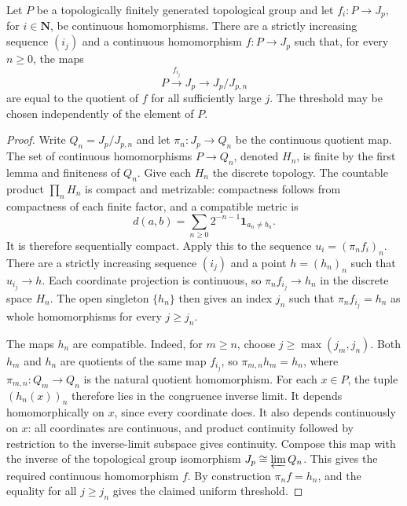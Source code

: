 \begin{lemma}
\label{lem:nottingham-hom-diagonal-limit}
\leanok
Let $P$ be a topologically finitely generated topological group and
let $f_i:P\to J_p$, for $i\in\mathbf N$, be continuous homomorphisms.
There are a strictly increasing sequence $(i_j)$ and a continuous
homomorphism $f:P\to J_p$ such that, for every $n\ge0$, the maps
\[
 P\xrightarrow{f_{i_j}}J_p\longrightarrow J_p/J_{p,n}
\]
are equal to the quotient of $f$ for all sufficiently large $j$.
The threshold may be chosen independently of the element of $P$.
\end{lemma}

\begin{proof}
Write $Q_n=J_p/J_{p,n}$ and let $\pi_n:J_p\to Q_n$ be the
continuous quotient map. The set of continuous homomorphisms
$P\to Q_n$, denoted $H_n$, is finite by the first lemma and
finiteness of $Q_n$. Give each $H_n$ the discrete topology.
The countable product $\prod_n H_n$ is compact and metrizable:
compactness follows from compactness of each finite factor, and
a compatible metric is
\[
 d(a,b)=\sum_{n\ge0}2^{-n-1}\mathbf 1_{a_n\ne b_n}.
\]
It is therefore sequentially compact. Apply this to the sequence
$u_i=(\pi_nf_i)_n$. There are a strictly increasing sequence
$(i_j)$ and a point $h=(h_n)_n$ such that $u_{i_j}\to h$.
Each coordinate projection is continuous, so
$\pi_nf_{i_j}\to h_n$ in the discrete space $H_n$.
The open singleton $\{h_n\}$ then gives an index $j_n$ such that
$\pi_nf_{i_j}=h_n$ as whole homomorphisms for every $j\ge j_n$.

The maps $h_n$ are compatible. Indeed, for $m\ge n$, choose
$j\ge\max(j_m,j_n)$. Both $h_m$ and $h_n$ are quotients of the same map
$f_{i_j}$, so $\pi_{m,n}h_m=h_n$, where $\pi_{m,n}:Q_m\to Q_n$
is the natural quotient homomorphism.
For each $x\in P$, the tuple $(h_n(x))_n$ therefore lies in
the congruence inverse limit. It depends homomorphically on $x$,
since every coordinate does. It also depends continuously on $x$:
all coordinates are continuous, and product continuity followed
by restriction to the inverse-limit subspace gives continuity.
Compose this map with the inverse of the topological group
isomorphism $J_p\cong\varprojlim Q_n$. This gives the required
continuous homomorphism $f$. By construction $\pi_nf=h_n$, and
the equality for all $j\ge j_n$ gives the claimed uniform threshold.
\end{proof}

